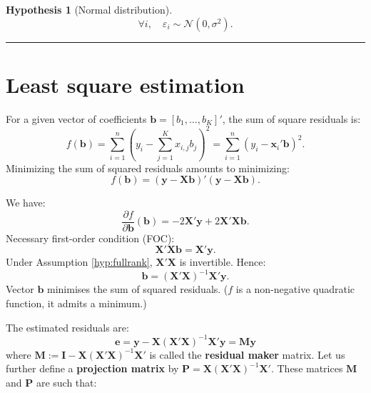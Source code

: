 \documentclass[
]{book}
\theoremstyle{definition}
\theoremstyle{definition}
\theoremstyle{definition}
\theoremstyle{definition}
\newtheorem{hypothesis}{Hypothesis}[chapter]
\theoremstyle{remark}
\begin{document}
\begin{hypothesis}[Normal distribution]
\protect\hypertarget{hyp:normality}{}\label{hyp:normality}\[
\forall i, \quad \varepsilon_i \sim \mathcal{N}(0,\sigma^2).
\]
\end{hypothesis}

\begin{center}\rule{0.5\linewidth}{0.5pt}\end{center}

\hypertarget{least-square-estimation}{%
\section{Least square estimation}\label{least-square-estimation}}

For a given vector of coefficients \(\mathbf{b}=[b_1,\dots,b_K]'\), the sum of square residuals is:
\[
f(\mathbf{b}) =\sum_{i=1}^n \left(y_i - \sum_{j=1}^K x_{i,j} b_j \right)^2 = \sum_{i=1}^n (y_i - \mathbf{x}_i' \mathbf{b})^2.
\]
Minimizing the sum of squared residuals amounts to minimizing:
\[
f(\mathbf{b}) = (\mathbf{y} - \mathbf{X}\mathbf{b})'(\mathbf{y} - \mathbf{X}\mathbf{b}).
\]

We have:
\[
\frac{\partial f}{\partial \mathbf{b}}(\mathbf{b}) = - 2 \mathbf{X}'\mathbf{y} + 2 \mathbf{X}'\mathbf{X}\mathbf{b}.
\]
Necessary first-order condition (FOC):
\begin{equation}
\mathbf{X}'\mathbf{X}\mathbf{b} = \mathbf{X}'\mathbf{y}.\label{eq:OLSFOC}
\end{equation}
Under Assumption \ref{hyp:fullrank}, \(\mathbf{X}'\mathbf{X}\) is invertible. Hence:
\[
\boxed{\mathbf{b} = (\mathbf{X}'\mathbf{X})^{-1} \mathbf{X}'\mathbf{y}.}
\]
Vector \(\mathbf{b}\) minimises the sum of squared residuals. (\(f\) is a non-negative quadratic function, it admits a minimum.)

The estimated residuals are:
\begin{equation}
\mathbf{e} = \mathbf{y} - \mathbf{X} (\mathbf{X}'\mathbf{X})^{-1} \mathbf{X}' \mathbf{y} = \mathbf{M} \mathbf{y}\label{eq:Mres}
\end{equation}
where \(\mathbf{M} := \mathbf{I} - \mathbf{X} (\mathbf{X}'\mathbf{X})^{-1} \mathbf{X}'\) is called the \textbf{residual maker} matrix. Let us further define a \textbf{projection matrix} by \(\mathbf{P}=\mathbf{X} (\mathbf{X}'\mathbf{X})^{-1} \mathbf{X}'\). These matrices \(\mathbf{M}\) and \(\mathbf{P}\) are such that:
\end{document}

